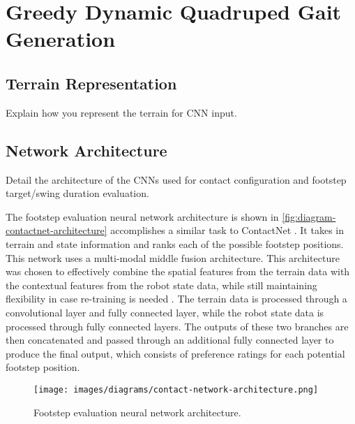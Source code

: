 \section{Greedy Dynamic Quadruped Gait Generation}

\subsection{Terrain Representation}

\begin{outline}
  Explain how you represent the terrain for CNN input.
\end{outline}

\subsection{Network Architecture}

\begin{outline}
  Detail the architecture of the CNNs used for contact configuration
  and footstep target/swing duration evaluation.
\end{outline}

The footstep evaluation neural network architecture is shown in
\autoref{fig:diagram-contactnet-architecture} accomplishes a similar
task to ContactNet \cite{bratta_contactnet_2024}. It takes in terrain
and state information and ranks each of the possible footstep
positions. This network uses a multi-modal middle fusion
architecture. This architecture was chosen to effectively combine the
spatial features from the terrain data with the contextual features
from the robot state data, while still maintaining flexibility in
case re-training is needed \cite{feng2021deep}. The terrain data is
processed through a convolutional layer and fully connected layer,
while the robot state data is processed through fully connected
layers. The outputs of these two branches are then concatenated and
passed through an additional fully connected layer to produce the
final output, which consists of preference ratings for each potential
footstep position.

\begin{figure}
  \centering
  \texttt{[image: images/diagrams/contact-network-architecture.png]}
  \caption{Footstep evaluation neural network architecture.}
  \label{fig:diagram-contactnet-architecture}
\end{figure}

